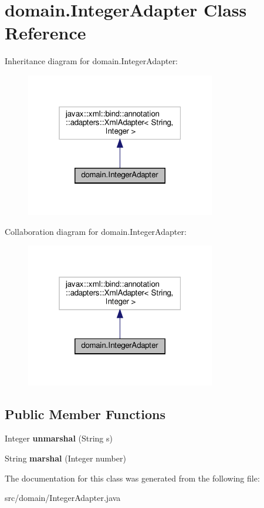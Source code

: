 \hypertarget{classdomain_1_1_integer_adapter}{}\section{domain.\+Integer\+Adapter Class Reference}
\label{classdomain_1_1_integer_adapter}


Inheritance diagram for domain.\+Integer\+Adapter\+:
\nopagebreak
\begin{figure}[H]
\begin{center}
\leavevmode
\includegraphics[width=235pt]{classdomain_1_1_integer_adapter__inherit__graph}
\end{center}
\end{figure}


Collaboration diagram for domain.\+Integer\+Adapter\+:
\nopagebreak
\begin{figure}[H]
\begin{center}
\leavevmode
\includegraphics[width=235pt]{classdomain_1_1_integer_adapter__coll__graph}
\end{center}
\end{figure}
\subsection*{Public Member Functions}
\begin{DoxyCompactItemize}
\item 
\mbox{\label{classdomain_1_1_integer_adapter_ad2bfc5af140573682dd03906b9264b51}} 
Integer {\bfseries unmarshal} (String s)
\item 
\mbox{\label{classdomain_1_1_integer_adapter_a407b4872b78e54ed80c9ae597cae2451}} 
String {\bfseries marshal} (Integer number)
\end{DoxyCompactItemize}


The documentation for this class was generated from the following file\+:\begin{DoxyCompactItemize}
\item 
src/domain/Integer\+Adapter.\+java\end{DoxyCompactItemize}
